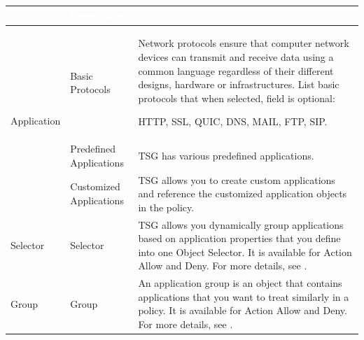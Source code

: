 \begin{longtable}{p{}|p{}|p{}}   
    \rowcolor{black}\multicolumn{2}{l!{\color{white}\vrule width 0.5pt}}{\textcolor{white}{Applications Type}}  & \textcolor{white}{Description}\\\hline                                                                                                                                                          
    \multirow{3}{*}{Application} & Basic Protocols & Network protocols ensure that computer network devices can transmit and receive data using a common language regardless of their different designs, hardware or infrastructures. 
    List basic protocols that when selected, field is optional: 
    
    
    HTTP, SSL, QUIC, DNS, MAIL, FTP, SIP.
    \\ \cline{2-3}
                                 & \tabincell{l}{Predefined\\ Applications} & TSG has various predefined applications. \\ \cline{2-3}
                                 & \tabincell{l}{Customized\\ Applications} & TSG allows you to create custom applications and reference the customized application objects in the policy.\\\hline
    Selector & Selector & TSG allows you dynamically group applications based on application properties that you define into one Object Selector. It is available for Action Allow and Deny. For more details, see \hyperlink{link:Application Selector}{\color{linkblue}{Application Selector}}.    \\ \hline 
    Group & Group & An application group is an object that contains applications that you want to treat similarly in a policy. It is available for Action Allow and Deny. For more details, see \hyperlink{link:Application Group}{\color{linkblue}{Application Group}}.    \\ \hline                                                                                                 
\end{longtable}


